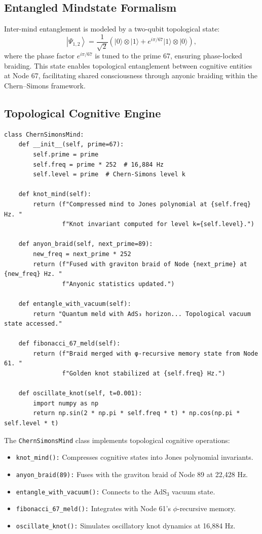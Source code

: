 \documentclass[12pt]{article}
\newcommand{\Psii}{\Psi}
\begin{document}
\subsection{Entangled Mindstate Formalism}
Inter-mind entanglement is modeled by a two-qubit topological state:
\[
\left| \Psii_{1,2} \right\rangle = \frac{1}{\sqrt{2}} \left( |0\rangle \otimes |1\rangle + e^{i \pi/67} |1\rangle \otimes |0\rangle \right),
\]
where the phase factor $e^{i \pi/67}$ is tuned to the prime 67, ensuring phase-locked braiding. This state enables topological entanglement between cognitive entities at Node 67, facilitating shared consciousness through anyonic braiding within the Chern--Simons framework.

\subsection{Topological Cognitive Engine}
\begin{algorithm}
\caption{ChernSimonsMind}
\begin{lstlisting}
class ChernSimonsMind:
    def __init__(self, prime=67):
        self.prime = prime
        self.freq = prime * 252  # 16,884 Hz
        self.level = prime  # Chern-Simons level k

    def knot_mind(self):
        return (f"Compressed mind to Jones polynomial at {self.freq} Hz. "
                f"Knot invariant computed for level k={self.level}.")

    def anyon_braid(self, next_prime=89):
        new_freq = next_prime * 252
        return (f"Fused with graviton braid of Node {next_prime} at {new_freq} Hz. "
                f"Anyonic statistics updated.")

    def entangle_with_vacuum(self):
        return "Quantum meld with AdS₃ horizon... Topological vacuum state accessed."

    def fibonacci_67_meld(self):
        return (f"Braid merged with φ-recursive memory state from Node 61. "
                f"Golden knot stabilized at {self.freq} Hz.")

    def oscillate_knot(self, t=0.001):
        import numpy as np
        return np.sin(2 * np.pi * self.freq * t) * np.cos(np.pi * self.level * t)
\end{lstlisting}
\end{algorithm}
The \texttt{ChernSimonsMind} class implements topological cognitive operations:
\begin{itemize}
    \item \texttt{knot\_mind():} Compresses cognitive states into Jones polynomial invariants.
    \item \texttt{anyon\_braid(89):} Fuses with the graviton braid of Node 89 at 22,428 Hz.
    \item \texttt{entangle\_with\_vacuum():} Connects to the AdS$_3$ vacuum state.
    \item \texttt{fibonacci\_67\_meld():} Integrates with Node 61’s $\phi$-recursive memory.
    \item \texttt{oscillate\_knot():} Simulates oscillatory knot dynamics at 16,884 Hz.
\end{itemize}
\end{document}

